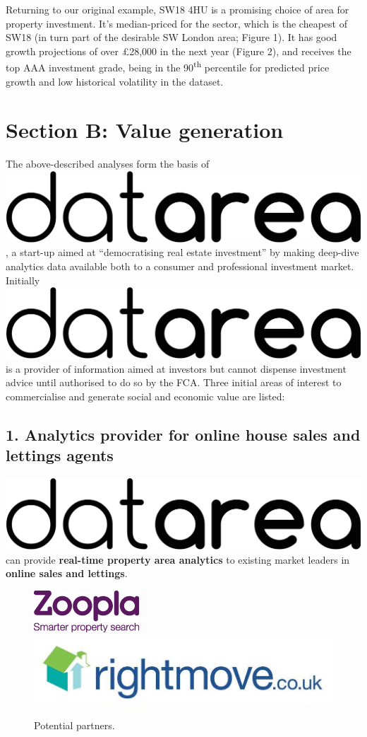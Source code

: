 \documentclass[
10pt, %
a4paper, %
oneside, %
headinclude,footinclude, %
BCOR5mm, %
]{scrartcl}
\newcommand*{\logo}{\includegraphics[scale=.04]{Figures/logotext.png}}
\begin{document}
Returning to our original example, SW18 4HU is a promising choice of
area for property investment. It's median-priced for the sector, which
is the cheapest of SW18 (in turn part of the desirable SW London area;
Figure 1). It has good growth projections of over £28,000 in the next
year (Figure 2), and receives the top AAA investment grade, being
in the 90\textsuperscript{th} percentile for predicted price growth
and low historical volatility in the dataset.

{\let\thefootnote\relax{}}

\clearpage
\section*{Section B: Value generation}

The above-described analyses form the basis of \logo\hspace{.1em}, a
start-up aimed at ``democratising real estate investment'' by making
deep-dive analytics data available both to a consumer and professional
investment market. Initially \logo\hspace{.1em} is a provider of
information aimed at investors but cannot dispense investment advice
until authorised to do so by the FCA. Three initial areas of interest
to commercialise and generate social and economic value are listed:

\subsection*{1. Analytics provider for online house sales and lettings
agents}

\logo\hspace{.1em} can provide {\bf real-time property area analytics} to
existing market leaders in {\bf online sales and lettings}. 

\begin{figure}
\begin{center}
\includegraphics[width=.18\textwidth]{Figures/zoopla.png}
\includegraphics[width=.23\textwidth]{Figures/rightmove.jpg}
\caption*{ Potential partners. }
\end{center}
\end{figure}
\end{document}
